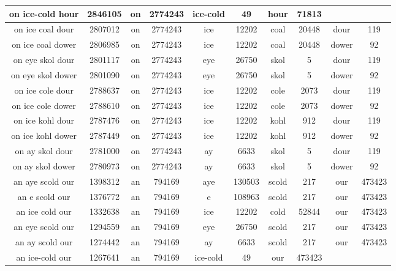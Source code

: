 \begin {longtable}{ cc|cccccccc }
 on ice-cold hour   &  2846105  &   on   &  2774243  &   ice-cold   &  49  &   hour   &  71813  &     &     \\ \hline
 on ice coal dour   &  2807012  &   on   &  2774243  &   ice   &  12202  &   coal   &  20448  &   dour   &  119   \\ \hline
 on ice coal dower   &  2806985  &   on   &  2774243  &   ice   &  12202  &   coal   &  20448  &   dower   &  92   \\ \hline
 on eye skol dour   &  2801117  &   on   &  2774243  &   eye   &  26750  &   skol   &  5  &   dour   &  119   \\ \hline
 on eye skol dower   &  2801090  &   on   &  2774243  &   eye   &  26750  &   skol   &  5  &   dower   &  92   \\ \hline
 on ice cole dour   &  2788637  &   on   &  2774243  &   ice   &  12202  &   cole   &  2073  &   dour   &  119   \\ \hline
 on ice cole dower   &  2788610  &   on   &  2774243  &   ice   &  12202  &   cole   &  2073  &   dower   &  92   \\ \hline
 on ice kohl dour   &  2787476  &   on   &  2774243  &   ice   &  12202  &   kohl   &  912  &   dour   &  119   \\ \hline
 on ice kohl dower   &  2787449  &   on   &  2774243  &   ice   &  12202  &   kohl   &  912  &   dower   &  92   \\ \hline
 on ay skol dour   &  2781000  &   on   &  2774243  &   ay   &  6633  &   skol   &  5  &   dour   &  119   \\ \hline
 on ay skol dower   &  2780973  &   on   &  2774243  &   ay   &  6633  &   skol   &  5  &   dower   &  92   \\ \hline
 an aye scold our   &  1398312  &   an   &  794169  &   aye   &  130503  &   scold   &  217  &   our   &  473423   \\ \hline
 an e scold our   &  1376772  &   an   &  794169  &   e   &  108963  &   scold   &  217  &   our   &  473423   \\ \hline
 an ice cold our   &  1332638  &   an   &  794169  &   ice   &  12202  &   cold   &  52844  &   our   &  473423   \\ \hline
 an eye scold our   &  1294559  &   an   &  794169  &   eye   &  26750  &   scold   &  217  &   our   &  473423   \\ \hline
 an ay scold our   &  1274442  &   an   &  794169  &   ay   &  6633  &   scold   &  217  &   our   &  473423   \\ \hline
 an ice-cold our   &  1267641  &   an   &  794169  &   ice-cold   &  49  &   our   &  473423  &     &     \\ \hline

\end{longtable}
